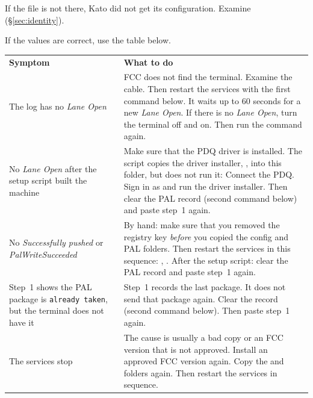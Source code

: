 \documentclass[a4paper,10pt]{article}
\begin{document}
\noindent If the file is not there, Kato did not get its configuration.
Examine  (\S\ref{sec:identity}).

\medskip\noindent If the values are correct, use the table below.

\begin{center}
\renewcommand{\arraystretch}{1.35}\small
\begin{tabularx}{\textwidth}{L{50mm} X}
\color{white}\textbf{Symptom} &
\color{white}\textbf{What to do}\\
The log has no \emph{Lane Open} &
FCC does not find the terminal. Examine the cable. Then restart the
services with the first command below. It waits up to 60 seconds for a
new \emph{Lane Open}. If there is no \emph{Lane Open}, turn the terminal
off and on. Then run the command again.\\
No \emph{Lane Open} after the setup script built the machine &
Make sure that the PDQ driver is installed. The script copies the driver
installer, , into this folder, but does not
run it:\newline
{}\newline Connect the PDQ. Sign in as  and run
the driver installer. Then clear the PAL record (second command below) and
paste step~1 again.\\
No \emph{Successfully pushed} or \emph{PalWriteSucceeded} &
By hand: make sure that you removed the 
registry key \emph{before} you copied the config and PAL folders. Then
restart the services in this sequence: ,
. After the setup script: clear the PAL record
and paste step~1 again.\\
Step~1 shows the PAL package is \texttt{already taken}, but the terminal
does not have it &
Step~1 records the last package. It does not send that package again.
Clear the record (second command below). Then paste step~1 again.\\
The services stop &
The cause is usually a bad copy or an FCC version that is not
approved. Install an approved FCC version again. Copy the 
and  folders again. Then restart the services in sequence.\\
\end{tabularx}
\end{center}
\end{document}
